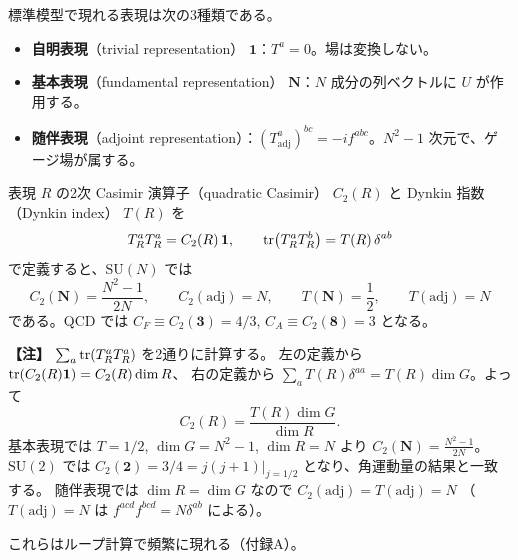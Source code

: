 \documentclass[uplatex,dvipdfmx,a4paper,11pt,openany]{jsbook}
\newcommand{\term}[2]{\textbf{#1}（#2）}
\newcommand{\en}[1]{（#1）}
\newenvironment{note}{\vspace{1ex}\par\footnotesize\noindent\textbf{【注】}}{\par\vspace{1ex}}
\numberwithin{equation}{chapter}
\theoremstyle{definition}
\theoremstyle{plain}
\theoremstyle{remark}
\newcommand{\SU}{\mathrm{SU}}
\begin{document}
標準模型で現れる表現は次の3種類である。
\begin{itemize}
    \item \term{自明表現}{trivial representation} $\mathbf{1}$：$T^a=0$。場は変換しない。
    \item \term{基本表現}{fundamental representation} $\mathbf{N}$：$N$ 成分の列ベクトルに $U$ が作用する。
    \item \term{随伴表現}{adjoint representation}：$(T^a_{\mathrm{adj}})^{bc}=-if^{abc}$。$N^2-1$ 次元で、ゲージ場が属する。
\end{itemize}
表現 $R$ の2次 Casimir 演算子\en{quadratic Casimir} $C_2(R)$ と Dynkin 指数\en{Dynkin index} $T(R)$ を
\begin{equation}
T^a_RT^a_R=C_2(R)\,\mathbf{1},\qquad
\tr(T^a_RT^b_R)=T(R)\,\delta^{ab}
\end{equation}
で定義すると、$\SU(N)$ では
\begin{equation}
C_2(\mathbf{N})=\frac{N^2-1}{2N},\qquad
C_2(\mathrm{adj})=N,\qquad
T(\mathbf{N})=\frac12,\qquad
T(\mathrm{adj})=N
\end{equation}
である。QCD では $C_F\equiv C_2(\mathbf{3})=4/3$, $C_A\equiv C_2(\mathbf{8})=3$ となる。
\begin{note}
$\sum_a\tr(T^a_RT^a_R)$ を2通りに計算する。
左の定義から $\tr(C_2(R)\mathbf 1)=C_2(R)\dim R$、
右の定義から $\sum_aT(R)\delta^{aa}=T(R)\dim G$。よって
\[
C_2(R)=\frac{T(R)\dim G}{\dim R}.
\]
基本表現では $T=1/2$, $\dim G=N^2-1$, $\dim R=N$ より $C_2(\mathbf N)=\frac{N^2-1}{2N}$。
$\SU(2)$ では $C_2(\mathbf2)=3/4=j(j+1)|_{j=1/2}$ となり、角運動量の結果と一致する。
随伴表現では $\dim R=\dim G$ なので $C_2(\mathrm{adj})=T(\mathrm{adj})=N$
（$T(\mathrm{adj})=N$ は $f^{acd}f^{bcd}=N\delta^{ab}$ による）。
\end{note}
これらはループ計算で頻繁に現れる（付録A）。
\end{document}
